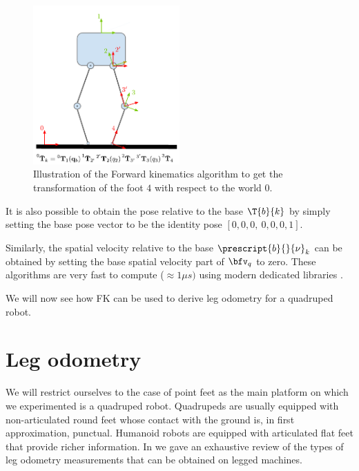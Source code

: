 \begin{figure}
    \centering
    \includegraphics[width=0.5\textwidth]{figures/kinematic_tree_FK.pdf}
    \caption{Illustration of the Forward kinematics algorithm to get the transformation of the foot $4$ with respect to the world $0$.}
    \label{fig:forward_kinematics}
\end{figure}


It is also possible to obtain the pose relative to the base $\T{b}{k}$ by simply setting the base pose vector to be the identity pose $[0,0,0,~0,0,0,1]$.



Similarly, the spatial velocity relative to the base $\prescript{b}{}{\mathbf{\nu}}_k$ can be obtained by setting the base spatial velocity part of $\bfv_q$ to zero.
These algorithms are very fast to compute ($\approx 1\mu s)$ using modern dedicated libraries \cite{carpentier2019pinocchio}.

We will now see how FK can be used to derive leg odometry for a quadruped robot.

\section{Leg odometry}
\label{sec:leg_odometry}
We will restrict ourselves to the case of point feet as the main platform on which we experimented is a quadruped robot.
Quadrupeds are usually equipped with non-articulated round feet whose contact with the ground is, in first approximation, punctual.
Humanoid robots are equipped with articulated flat feet that provide richer information. In  we gave an exhaustive review of the types of leg 
odometry measurements that can be obtained on legged machines.

